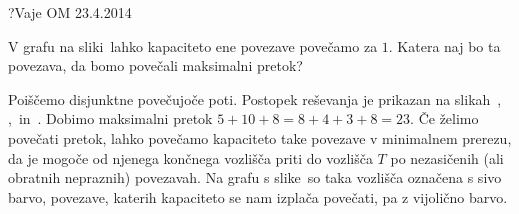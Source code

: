 \begin{naloga}{?}{Vaje OM 23.4.2014}
\begin{vprasanje}
V grafu na sliki~\fig lahko kapaciteto ene povezave povečamo za $1$.
Katera naj bo ta povezava, da bomo povečali maksimalni pretok?

\begin{slika}
\pgfslika
{}
\end{slika}
\end{vprasanje}

\begin{odgovor}
Poiščemo disjunktne povečujoče poti.
Postopek reševanja je prikazan na slikah~,~%
,~ in~.
Dobimo maksimalni pretok $5+10+8 = 8+4+3+8 = 23$.
Če želimo povečati pretok,
lahko povečamo kapaciteto take povezave v minimalnem prerezu,
da je mogoče od njenega končnega vozlišča priti do vozlišča $T$
po nezasičenih (ali obratnih nepraznih) povezavah.
Na grafu s slike~
so taka vozlišča označena s sivo barvo,
povezave, katerih kapaciteto se nam izplača povečati, pa z vijolično barvo.

\begin{slika}
\end{slika}
\begin{slika}
\end{slika}
\begin{slika}
\end{slika}
\begin{slika}
\end{slika}
\end{odgovor}
\end{naloga}
